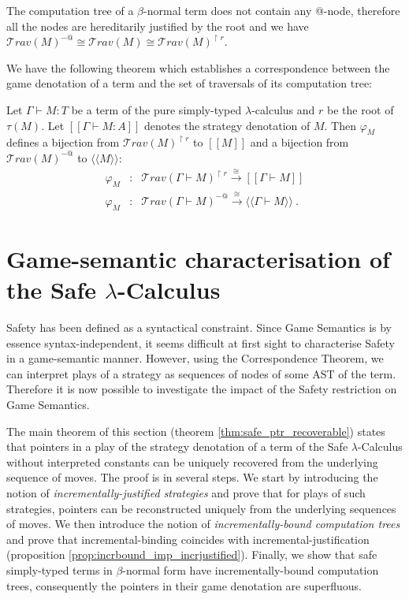 \documentclass{llncs}
\newcommand\travset{\mathcal{T}rav}
\newcommand{\lsem}{[\![} %
\newcommand{\rsem}{]\!]} %
\newcommand{\sem}[1]{{\lsem #1 \rsem}}
\newcommand{\intersem}[1]{{\langle\!\langle #1 \rangle\!\rangle}}
\begin{document}
The computation tree of a $\beta$-normal term does not contain any @-node, therefore all the nodes are
hereditarily justified by the root and we have $\travset(M)^{-@} \cong \travset(M) \cong  \travset(M)^{\upharpoonright r }$.

We have the following theorem which establishes a correspondence between the game denotation of a
term and the set of traversals of its computation tree:
\begin{theorem}
\label{thm:correspondence}
Let $\Gamma \vdash M : T$ be a term of the pure simply-typed $\lambda$-calculus and $r$ be the root of $\tau(M)$.
Let $\sem{\Gamma \vdash M : A}$ denotes the strategy denotation of $M$.
Then $\varphi_M$ defines a bijection from $\travset(M)^{\upharpoonright
r}$ to $\sem{M}$ and a bijection from $\travset(M)^{-@}$ to $\intersem{M}$:
\begin{eqnarray*}
 \varphi_M  &:& \travset(\Gamma \vdash M)^{\upharpoonright r} \stackrel{\cong}{\longrightarrow} \sem{\Gamma \vdash M} \\
 \varphi_M  &:& \travset(\Gamma \vdash M)^{-@} \stackrel{\cong}{\longrightarrow} \intersem{\Gamma \vdash M} \ .
\end{eqnarray*}
\end{theorem}

\section{Game-semantic characterisation of the Safe $\lambda$-Calculus}

Safety has been defined as a syntactical constraint. Since Game
Semantics is by essence syntax-independent, it seems difficult at
first sight to characterise Safety in a game-semantic manner.
However, using the Correspondence Theorem, we can interpret plays
of a strategy as sequences of nodes of some AST of the term.
Therefore it is now possible to investigate the impact of the Safety
restriction on Game Semantics.

The main theorem of this section (theorem
\ref{thm:safe_ptr_recoverable}) states that pointers in a play of
the strategy denotation of a term of the Safe $\lambda$-Calculus without interpreted
constants can be uniquely recovered
from the underlying sequence of moves. The proof is in several
steps. We start by introducing the notion of
\emph{incrementally-justified strategies} and prove that for plays
of such strategies, pointers can be reconstructed uniquely from the
underlying sequences of moves. We then introduce the notion of
\emph{incrementally-bound computation trees} and prove that
incremental-binding coincides with incremental-justification
(proposition \ref{prop:incrbound_imp_incrjustified}). Finally, we
show that safe simply-typed terms in $\beta$-normal form have
incrementally-bound computation trees, consequently the pointers in
their game denotation are superfluous.
\end{document}
